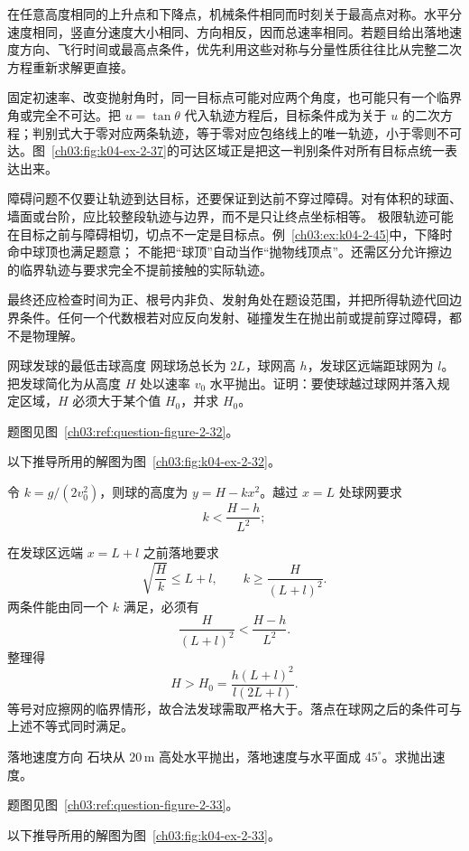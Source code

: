 {在任意高度相同的上升点和下降点，机械条件相同而时刻关于最高点对称。水平分速度相同，竖直分速度大小相同、方向相反，因而总速率相同。若题目给出落地速度方向、飞行时间或最高点条件，优先利用这些对称与分量性质往往比从完整二次方程重新求解更直接。

固定初速率、改变抛射角时，同一目标点可能对应两个角度，也可能只有一个临界角或完全不可达。把 $u=\tan\theta$ 代入轨迹方程后，目标条件成为关于 $u$ 的二次方程；判别式大于零对应两条轨迹，等于零对应包络线上的唯一轨迹，小于零则不可达。图~\ref{ch03:fig:k04-ex-2-37}的可达区域正是把这一判别条件对所有目标点统一表达出来。

障碍问题不仅要让轨迹到达目标，还要保证到达前不穿过障碍。对有体积的球面、墙面或台阶，应比较整段轨迹与边界，而不是只让终点坐标相等。
极限轨迹可能在目标之前与障碍相切，切点不一定是目标点。例~\ref{ch03:ex:k04-2-45}中，下降时命中球顶也满足题意；
不能把“球顶”自动当作“抛物线顶点”。还需区分允许擦边的临界轨迹与要求完全不提前接触的实际轨迹。

最终还应检查时间为正、根号内非负、发射角处在题设范围，并把所得轨迹代回边界条件。任何一个代数根若对应反向发射、碰撞发生在抛出前或提前穿过障碍，都不是物理解。

\begin{origexamplebox}{网球发球的最低击球高度}\label{ch03:ex:k04-2-32}
网球场总长为 $2L$，球网高 $h$，发球区远端距球网为 $l$。把发球简化为从高度 $H$ 处以速率 $v_0$ 水平抛出。证明：要使球越过球网并落入规定区域，$H$ 必须大于某个值 $H_0$，并求 $H_0$。
\par 题图见图~\ref{ch03:ref:question-figure-2-32}。
\KQuestionBG
\end{origexamplebox}
\begin{xesolution}
以下推导所用的解图为图~\ref{ch03:fig:k04-ex-2-32}。

令 $k=g/(2v_0^2)$，则球的高度为 $y=H-kx^2$。越过 $x=L$ 处球网要求
\[
 k<\frac{H-h}{L^2};
\]
\TennisServeDiagram

在发球区远端 $x=L+l$ 之前落地要求
\[
 \sqrt{\frac Hk}\le L+l,\qquad k\ge\frac{H}{(L+l)^2}.
\]
两条件能由同一个 $k$ 满足，必须有
\[
 \frac{H}{(L+l)^2}<\frac{H-h}{L^2}.
\]
整理得
\[
 \boxed{H>H_0=\frac{h(L+l)^2}{l(2L+l)}}.
\]
等号对应擦网的临界情形，故合法发球需取严格大于。落点在球网之后的条件可与上述不等式同时满足。
\end{xesolution}


\begin{origexamplebox}{落地速度方向}\label{ch03:ex:k04-2-33}
石块从 $20\,\mathrm m$ 高处水平抛出，落地速度与水平面成 $45^\circ$。求抛出速度。
\par 题图见图~\ref{ch03:ref:question-figure-2-33}。
\KQuestionBH
\end{origexamplebox}
\begin{xesolution}
以下推导所用的解图为图~\ref{ch03:fig:k04-ex-2-33}。


\end{xesolution}}
